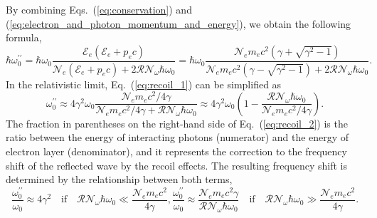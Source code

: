 \documentclass[10pt, a4paper, twoside, openright]{report}
\begin{document}
By combining Eqs.~(\ref{eq:conservation}) and (\ref{eq:electron_and_photon_momentum_and_energy}), we obtain the following formula,
\begin{equation}\label{eq:recoil_1}
\hbar \omega_0^{\prime \prime} = \hbar \omega_0 \frac{\mathcal{E}_e \left( \mathcal{E}_e + p_e c \right)}{\mathcal{N}_e \left( \mathcal{E}_e + p_e c \right) + 2 \mathcal{R} \mathcal{N}_{\omega} \hbar \omega_0} = \hbar \omega_0 \frac{\mathcal{N}_e m_e c^2 \left( \gamma + \sqrt{\gamma^2 - 1} \right)}{\mathcal{N}_e m_e c^2 \left( \gamma - \sqrt{\gamma^2 - 1} \right) + 2 \mathcal{R} \mathcal{N}_{\omega} \hbar \omega_0}.
\end{equation}
In the relativistic limit, Eq.~(\ref{eq:recoil_1}) can be simplified as
\begin{equation}\label{eq:recoil_2}
\omega_0^{\prime \prime} \approx 4 \gamma^2 \omega_0 \frac{\mathcal{N}_e m_e c^2 / 4 \gamma}{\mathcal{N}_e m_e c^2 / 4 \gamma + \mathcal{R} \mathcal{N}_{\omega} \hbar \omega_0} \approx 4 \gamma^2 \omega_0 \left( 1 - \frac{\mathcal{R} \mathcal{N}_{\omega} \hbar \omega_0}{\mathcal{N}_e m_e c^2 / 4 \gamma} \right).
\end{equation}
The fraction in parentheses on the right-hand side of Eq.~(\ref{eq:recoil_2}) is the ratio between the energy of interacting photons (numerator) and the energy of electron layer (denominator), and it represents the correction to the frequency shift of the reflected wave by the recoil effects. The resulting frequency shift is determined by the relationship between both terms,
\begin{subequations}
\begin{equation}\label{eq:recoil_limit_1}
\frac{\omega_0^{\prime \prime}}{\omega_0} \approx 4 \gamma^2 \quad \mathrm{if} \quad \mathcal{R} \mathcal{N}_{\omega} \hbar \omega_0 \ll \frac{\mathcal{N}_e m_e c^2}{4 \gamma},
\end{equation}
\begin{equation}\label{eq:recoil_limit_2}
\frac{\omega_0^{\prime \prime}}{\omega_0} \approx \frac{\mathcal{N}_e m_e c^2 \gamma}{\mathcal{R} \mathcal{N}_{\omega} \hbar  \omega_0} \quad \mathrm{if} \quad \mathcal{R} \mathcal{N}_{\omega} \hbar \omega_0 \gg \frac{\mathcal{N}_e m_e c^2}{4 \gamma}. 
\end{equation}
\end{subequations}
\end{document}
